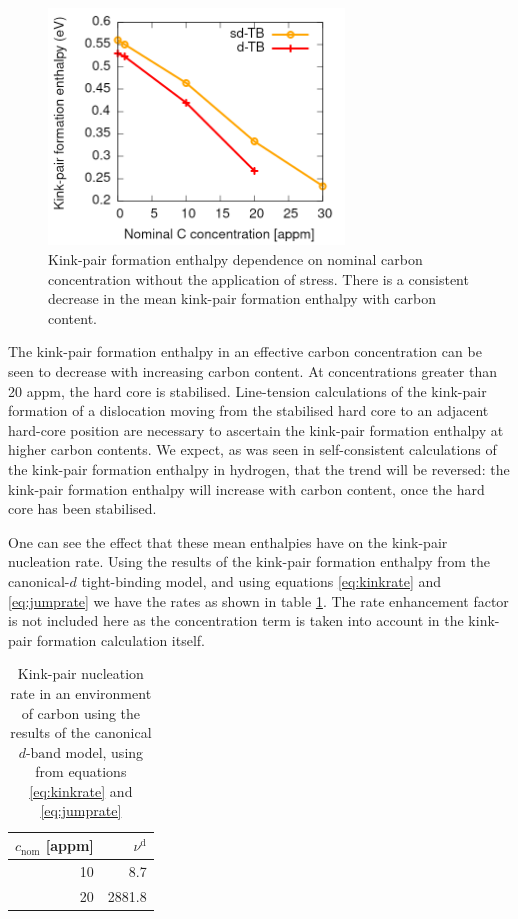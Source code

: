 \documentclass[a4paper,12pt,oneside,print,numbered,index,PageStyleIII]{PhDThesisPSnPDF}
\begin{document}
\begin{enumerate}
\begin{figure}[htbp]
\centering
\includegraphics[width=0.7\textwidth]{iron/Images/kink-pair_formation_equilibrium_sdtb_dtb_30appm.png}
\caption{Kink-pair formation enthalpy dependence on nominal carbon concentration without the application of stress. There is a consistent decrease in the mean kink-pair formation enthalpy with carbon content.}
\end{figure}

The kink-pair formation enthalpy in an effective carbon concentration can be
seen to decrease with increasing carbon content. At concentrations greater
than 20 appm, the hard core is stabilised. Line-tension calculations of the
kink-pair formation of a dislocation moving from the stabilised hard
core to an adjacent hard-core position are necessary to ascertain the
kink-pair formation enthalpy at higher carbon contents. We expect, as
was seen in self-consistent calculations of the kink-pair formation enthalpy
in hydrogen, that the trend will be reversed: the kink-pair formation
enthalpy will increase with carbon content, once the hard core has been stabilised.


One can see the effect that these mean enthalpies have on the kink-pair nucleation
rate. Using the results of the kink-pair formation enthalpy from the canonical-\(d\)
tight-binding model, and using equations \eqref{eq:kinkrate} and \eqref{eq:jumprate}
we have the rates as shown in table \ref{eqkinkrate}. The rate enhancement factor is not
included here as the concentration term is taken into account in the
kink-pair formation calculation itself.

\begin{table}[htbp]
\caption{Kink-pair nucleation rate in an environment of carbon using the results of the canonical \(d \text{-band}\) model, using from equations \eqref{eq:kinkrate} and \eqref{eq:jumprate} \label{eqkinkrate}}
\centering
\begin{tabular}{rr}
\(c_{\text{nom}}\) [appm] & \(\nu^{\text{d}}\)\\
\hline
10 & 8.7\\
20 & 2881.8\\
\end{tabular}
\end{table}



\end{enumerate}
\end{document}
